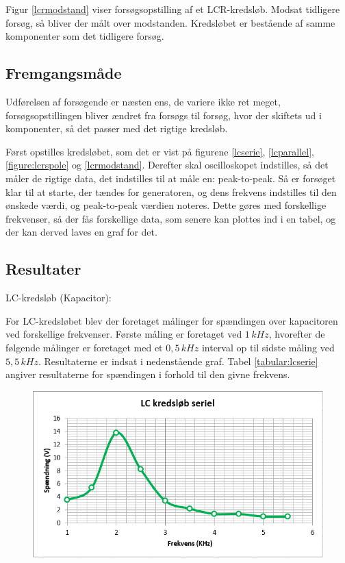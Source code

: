 Figur \ref{lcrmodstand} viser forsøgsopstilling af et LCR-kredsløb. Modsat tidligere forsøg, så bliver der målt over modstanden. Kredsløbet er bestående af samme komponenter som det tidligere forsøg.

\subsection{Fremgangsmåde}

Udførelsen af forsøgende er næsten ens, de variere ikke ret meget, forsøgsopstillingen bliver ændret fra forsøgs til forsøg, hvor der skiftets ud i komponenter, så det passer med det rigtige kredsløb.

Først opstilles kredsløbet, som det er vist på figurene \ref{lcserie}, \ref{lcparallel}, \ref{figure:lcrspole} og \ref{lcrmodstand}. Derefter skal oscilloskopet indstilles, så det måler de rigtige data, det indstilles til at måle en: peak-to-peak. Så er forsøget klar til at starte, der tændes for generatoren, og dens frekvens indstilles til den ønskede værdi, og peak-to-peak værdien noteres. Dette gøres med forskellige frekvenser, så der fås forskellige data, som senere kan plottes ind i en tabel, og der kan derved laves en graf for det.

\subsection{Resultater}

LC-kredsløb (Kapacitor):

For LC-kredsløbet blev der foretaget målinger for spændingen over kapacitoren ved forskellige frekvenser. Første måling er foretaget ved $1 \, kHz$, hvorefter de følgende målinger er foretaget med et $0,5\, kHz$ interval op til sidste måling ved $5,5\, kHz$. Resultaterne er indsat i nedenstående graf. Tabel \ref{tabular:lcserie} angiver resultaterne for spændingen i forhold til den givne frekvens.

\begin{figure}[H]
\includegraphics[scale=1]{Setup/Graf3}
\caption{}
\label{graph:lcserie}
\end{figure}

